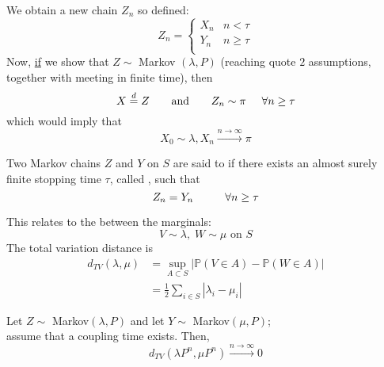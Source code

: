 \documentclass{article}
\begin{document}
	We obtain a new chain $Z_n$ so defined:
	\[
	Z_n = 
	\begin{cases}
		X_n & n<\tau \\
		Y_n & n \geq \tau \\
	\end{cases}
	\]
	Now, \underline{if} we show that $Z \sim$ Markov $(\lambda, P)$ (reaching quote $2$ assumptions, together with meeting in finite time), then 
	\[
	X \stackrel{d}= Z \qquad\text{and}\qquad
	Z_n \sim \pi \hspace{0.5 cm} \forall n \geq \tau\]
	which would imply that 
	\begin{equation*}
		X_0 \sim \lambda, X_n \xrightarrow{n \rightarrow \infty} \pi 
	\end{equation*}
	\begin{definition}
		Two Markov chains $Z$ and $Y$ on $S$ are said to  if there exists an almost surely finite stopping time $\tau$, called , such that 
		\begin{equation*}
			Z_n = Y_n \hspace{1 cm} \forall n \geq \tau
		\end{equation*}
	\end{definition}
	This relates to the  between the marginals:
	\begin{equation*}
		V \sim \lambda,\; W \sim \mu \text{ on } S
	\end{equation*}
	The total variation distance is 
	\begin{align*}
		d_{TV}(\lambda,\mu) &= \sup_{A \subset S} |\mathbb{P}(V \in A) - \mathbb{P}(W \in A)| \\
		&= \frac{1}{2} \sum_{i \in S} |\lambda_i - \mu_i|
	\end{align*}
	\begin{proposition}
		\label{totvardist}
		Let $Z \sim$ Markov$(\lambda, P)$ and 
		let $Y \sim$ Markov$(\mu, P)$; \\
		assume that a coupling time exists. Then,
		\begin{equation*}
			d_{TV}(\lambda P^n, \mu P^n) \xrightarrow{n \rightarrow \infty} 0
		\end{equation*}
	\end{proposition}
	
\end{document}
